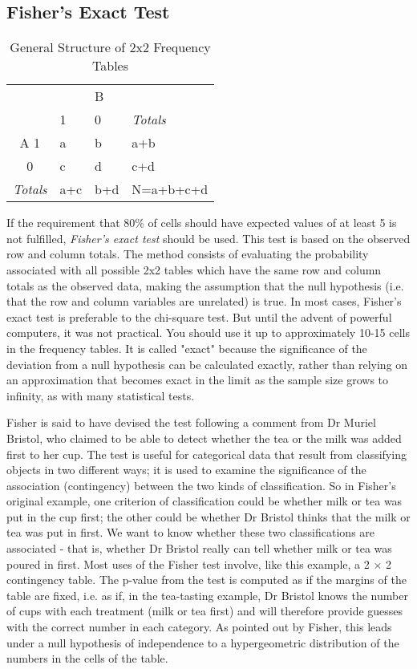 \subsection{Fisher's Exact Test} 

\begin{table}
  \centering
  \begin{tabular}{|c|l l| l|}
  \hline
  &  & B &  \\
  & 1 & 0 & \emph{Totals} \\
  \hline
  A 1 & a & b & a+b \\
    0 & c & d & c+d \\
  \hline
  \emph{Totals} & a+c & b+d & N=a+b+c+d \\
  \hline
  \end{tabular}

  \caption{General Structure of 2x2 Frequency Tables}\label{table:frequencyGeneral}
\end{table}


If the requirement that 80\% of cells should have expected values of at least 5 is not fulfilled, \emph{Fisher's exact test} should be used. This test is based on the observed row and column totals. The method consists of evaluating the probability associated with all possible 2x2 tables which have the same row and column totals as the observed data, making the assumption that the null hypothesis (i.e. that the row and column variables are unrelated) is true.  In most cases, Fisher's exact test is preferable to the chi-square test. But until the advent of powerful computers, it was not practical. You should use it up to approximately 10-15 cells in the frequency tables. It is called "exact" because the significance of the deviation from a null hypothesis can be calculated exactly, rather than relying on an approximation that becomes exact in the limit as the sample size grows to infinity, as with many statistical tests.

Fisher is said to have devised the test following a comment from Dr Muriel Bristol, who claimed to be able to detect whether the tea or the milk was added first to her cup. The test is useful for categorical data that result from classifying objects in two different ways; it is used to examine the significance of the association (contingency) between the two kinds of classification. So in Fisher's original example, one criterion of classification could be whether milk or tea was put in the cup first; the other could be whether Dr Bristol thinks that the milk or tea was put in first. We want to know whether these two classifications are associated - that is, whether Dr Bristol really can tell whether milk or tea was poured in first. Most uses of the Fisher test involve, like this example, a 2 × 2 contingency table. The p-value from the test is computed as if the margins of the table are fixed, i.e. as if, in the tea-tasting example, Dr Bristol knows the number of cups with each treatment (milk or tea first) and will therefore provide guesses with the correct number in each category. As pointed out by Fisher, this leads under a null hypothesis of independence to a hypergeometric distribution of the numbers in the cells of the table.

